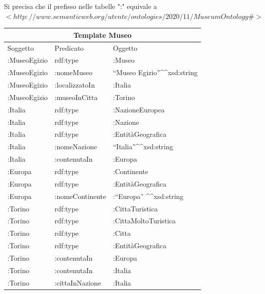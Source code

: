 \documentclass[12pt]{article}
\begin{document}
Si precisa che il prefisso nelle tabelle ":" equivale a \\$<http://www.semanticweb.org/utente/ontologies/2020/11/MuseumOntology\#>$
\newline
\begin{center}
 \begin{tabular}{ |p{3cm}|p{3cm}|p{3cm}| }
 \hline
 \multicolumn{3}{|c|}{Template Museo} \\
 \hline
 Soggetto & Predicato & Oggetto\\
 \hline
 :MuseoEgizio & rdf:type &:Museo   \\
 :MuseoEgizio &   :nomeMuseo  & “Museo Egizio”\textasciicircum \textasciicircum xsd:string   \\
 :MuseoEgizio & :localizzatoIn & :Italia\\
 :MuseoEgizio &:museoInCitta & :Torino\\
 :Italia & rdf:type & :NazioneEuropea\\
 :Italia & rdf:type  & :Nazione   \\
 :Italia & rdf:type  & :EntitàGeografica\\
 :Italia & :nomeNazione  & “Italia”\textasciicircum \textasciicircum xsd:string   \\
 :Italia & :contenutaIn  & :Europa\\
 :Europa & rdf:type  & :Continente   \\
 :Europa & rdf:type  & :EntitàGeografica\\
 :Europa & :nomeContinente  & :“Europa” \textasciicircum \textasciicircum xsd:string\\
 :Torino &   rdf:type  & :CittaTuristica\\
 :Torino & rdf:type  & :CittaMoltoTuristica   \\
 :Torino & rdf:type  & :Citta\\
 :Torino & rdf:type  & :EntitàGeografica   \\
 :Torino & :contenutaIn  & :Europa\\
 :Torino &   :contenutaIn  & :Italia\\
 :Torino &   :cittaInNazione  & :Italia\\
 \hline
\end{tabular}
\end{center}
\end{document}
